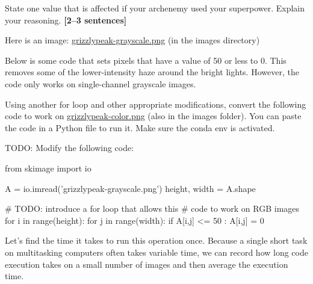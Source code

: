 \documentclass{csci1430}
\begin{document}
\begin{subsubquestion}[points=3]
State one value that is affected if your archenemy used your superpower. Explain your reasoning. \textbf{[2--3 sentences]}
\end{subsubquestion}
    
\begin{answer}[height=7]

\end{answer}

\pagebreak %

\begin{question}[points=6,drawbox=false]
Here is an image: \href{run:images/grizzlypeak-grayscale.png}{grizzlypeak-grayscale.png} (in the images directory)
\end{question}

\begin{subquestion}[drawbox=false]
Below is some code that sets pixels that have a value of 50 or less to 0. This removes some of the lower-intensity haze around the bright lights. However, the code only works on single-channel grayscale images.
\end{subquestion}

\begin{subsubquestion}[points=2]
Using another for loop and other appropriate modifications, convert the following code to work on \href{run:images/grizzlypeak-color.png}{grizzlypeak-color.png} (also in the images folder). You can paste the code in a Python file to run it. Make sure the conda env is activated.
\end{subsubquestion}

\begin{answer}[height=20]

TODO: Modify the following code:
\begin{python}
from skimage import io

A = io.imread('grizzlypeak-grayscale.png')
height, width = A.shape

# TODO: introduce a for loop that allows this 
# code to work on RGB images
for i in range(height):
    for j in range(width):
        if A[i,j] <= 50 :
            A[i,j] = 0
\end{python}
    
\end{answer}

\pagebreak
Let's find the time it takes to run this operation once. Because a single short task on multitasking computers often takes variable time, we can record how long code execution takes on a small number of images and then average the execution time.
\end{document}
